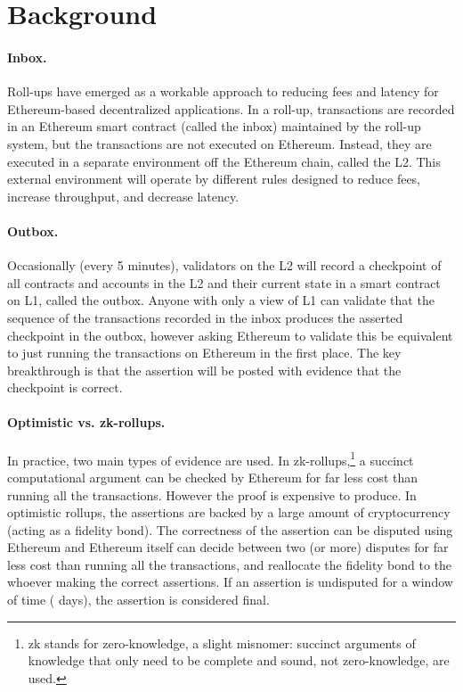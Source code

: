 
\section{Background} 

\paragraph{Inbox.} Roll-ups have emerged as a workable approach to reducing fees and latency for Ethereum-based decentralized applications. In a roll-up, transactions are recorded in an Ethereum smart contract (called the inbox) maintained by the roll-up system, but the transactions are not executed on Ethereum. Instead, they are executed in a separate environment off the Ethereum chain, called the L2. This external environment will operate by different rules designed to reduce fees, increase throughput, and decrease latency. 

\paragraph{Outbox.} Occasionally (\eg every 5 minutes), validators on the L2 will record a checkpoint of all contracts and accounts in the L2 and their current state in a smart contract on L1, called the outbox. Anyone with only a view of L1 can validate that the sequence of the transactions recorded in the inbox produces the asserted checkpoint in the outbox, however asking Ethereum to validate this be equivalent to just running the transactions on Ethereum in the first place. The key breakthrough is that the assertion will be posted with evidence that the checkpoint is correct.

\paragraph{Optimistic vs. zk-rollups.} In practice, two main types of evidence are used. In zk-rollups,\footnote{zk stands for zero-knowledge, a slight misnomer: succinct arguments of knowledge that only need to be complete and sound, not zero-knowledge, are used.} a succinct computational argument can be checked by Ethereum for far less cost than running all the transactions. However the proof is expensive to produce. In optimistic rollups, the assertions are backed by a large amount of cryptocurrency (acting as a fidelity bond). The correctness of the assertion can be disputed using Ethereum and Ethereum itself can decide between two (or more) disputes for far less cost than running all the transactions, and reallocate the fidelity bond to the whoever making the correct assertions. If an assertion is undisputed for a window of time ( days), the assertion is considered final.

